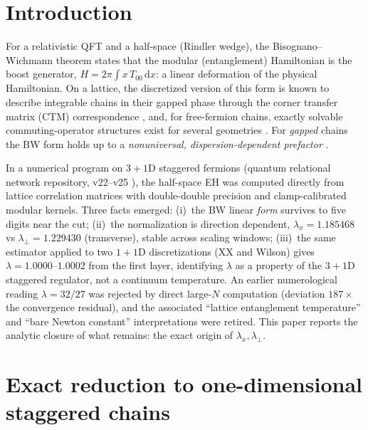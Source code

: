 \documentclass[aps,prb,preprint,nofootinbib]{revtex4-2}
\begin{document}
\maketitle

\section{Introduction}

For a relativistic QFT and a half-space (Rindler wedge), the
Bisognano--Wichmann theorem \cite{BW} states that the modular (entanglement)
Hamiltonian is the boost generator, $H = 2\pi\int x\,T_{00}\,\mathrm{d}x$: a
linear deformation of the physical Hamiltonian. On a lattice, the discretized
version of this form is known to describe integrable chains in their gapped
phase through the corner transfer matrix (CTM) correspondence \cite{Baxter,
PeschelKaulkeLegeza}, and, for free-fermion chains, exactly solvable
commuting-operator structures exist for several geometries
\cite{EislerPeschel2017}. For \emph{gapped} chains the BW form holds up to a
\emph{nonuniversal, dispersion-dependent prefactor} \cite{Eisler2024}.

In a numerical program on $3+1$D staggered fermions (quantum relational
network repository, v22--v25 \cite{Repo}), the half-space EH was computed
directly from lattice correlation matrices with double-double precision and
clamp-calibrated modular kernels. Three facts emerged: (i)~the BW linear
\emph{form} survives to five digits near the cut; (ii)~the normalization is
direction dependent, $\lambda_x = 1.185468$ vs $\lambda_\perp = 1.229430$
(transverse), stable across scaling windows; (iii)~the same estimator applied
to two $1+1$D discretizations (XX and Wilson) gives $\lambda = 1.0000$--$1.0002$
from the first layer, identifying $\lambda$ as a property of the $3+1$D
staggered regulator, not a continuum temperature. An earlier numerological
reading $\lambda = 32/27$ was rejected by direct large-$N$ computation
(deviation $187\times$ the convergence residual), and the associated ``lattice
entanglement temperature'' and ``bare Newton constant'' interpretations were
retired. This paper reports the analytic closure of what remains: the exact
origin of $\lambda_x, \lambda_\perp$.

\section{Exact reduction to one-dimensional staggered chains}
\end{document}
